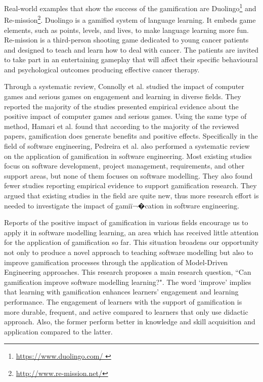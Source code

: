\documentclass[12pt, a4paper]{report}
\begin{document}
Real-world examples that show the success of the gamification are Duolingo\footnote{\url{https://www.duolingo.com/
}} and Re-mission\footnote{\url{http://www.re-mission.net/}}. Duolingo is a gamified system of language learning. It embeds game elements, such as points, levels, and lives, to make language learning more fun. Re-mission is a third-person shooting game dedicated to young cancer patients and designed to teach and learn how to deal with cancer. The patients are invited to take part in an entertaining gameplay that will affect their specific behavioural and psychological outcomes producing effective cancer therapy.
 
Through a systematic review, Connolly et al. \cite{connolly2012systematic} studied the impact of computer games and serious games on engagement and learning in diverse fields. They reported the majority of the studies presented empirical evidence about the positive impact of computer games and serious games. Using the same type of method, Hamari et al. \cite{hamari2014does} found that according to the majority of the reviewed papers, gamification does generate benefits and positive effects. Specifically in the field of software engineering, Pedreira et al. \cite{Pedreira2015} also performed a systematic review on the application of gamification in software engineering. Most existing studies focus on software development, project management, requirements, and other support areas, but none of them focuses on software modelling. They also found fewer studies reporting empirical evidence to support gamification research. They argued that existing studies in the field are quite new, thus more research effort is needed to investigate the impact of gamiï¬�cation in software engineering. 

Reports of the positive impact of gamification in various fields encourage us to apply it in software modelling learning, an area which has received little attention for the application of gamification so far. This situation broadens our opportunity not only to produce a novel approach to teaching software modelling but also to improve gamification processes through the application of Model-Driven Engineering approaches. This research proposes a main research question, ``Can gamification improve software modelling learning?". The word `improve' implies that learning with gamification enhances learners' engagement and learning performance. The engagement of learners with the support of gamification is more durable, frequent, and active compared to learners that only use didactic approach. Also, the former perform better in knowledge and skill acquisition and application compared to the latter.   
\end{document}
